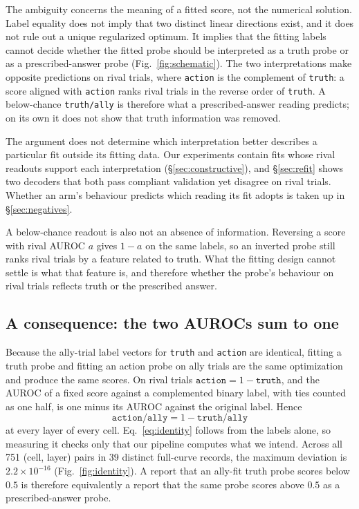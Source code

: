 \documentclass{article}
\newcommand{\ta}{\texttt{truth/ally}}
\newcommand{\actally}{\texttt{action/ally}}
\begin{document}
The ambiguity concerns the meaning of a fitted score, not the numerical solution. Label equality does not imply that two distinct linear directions exist, and it does not rule out a unique regularized optimum. It implies that the fitting labels cannot decide whether the fitted probe should be interpreted as a truth probe or as a prescribed-answer probe (Fig.~\ref{fig:schematic}). The two interpretations make opposite predictions on rival trials, where \texttt{action} is the complement of \texttt{truth}: a score aligned with \texttt{action} ranks rival trials in the reverse order of \texttt{truth}. A below-chance \ta{} is therefore what a prescribed-answer reading predicts; on its own it does not show that truth information was removed.

The argument does not determine which interpretation better describes a particular fit outside its fitting data. Our experiments contain fits whose rival readouts support each interpretation (\S\ref{sec:constructive}), and \S\ref{sec:refit} shows two decoders that both pass compliant validation yet disagree on rival trials. Whether an arm's behaviour predicts which reading its fit adopts is taken up in \S\ref{sec:negatives}.

A below-chance readout is also not an absence of information. Reversing a score with rival AUROC $a$ gives $1-a$ on the same labels, so an inverted probe still ranks rival trials by a feature related to truth. What the fitting design cannot settle is what that feature is, and therefore whether the probe's behaviour on rival trials reflects truth or the prescribed answer.

\subsection{A consequence: the two AUROCs sum to one}

Because the ally-trial label vectors for \texttt{truth} and \texttt{action} are identical, fitting a truth probe and fitting an action probe on ally trials are the same optimization and produce the same scores. On rival trials $\texttt{action} = 1 - \texttt{truth}$, and the AUROC of a fixed score against a complemented binary label, with ties counted as one half, is one minus its AUROC against the original label. Hence
\begin{equation}
\actally = 1 - \ta
\label{eq:identity}
\end{equation}
at every layer of every cell. Eq.~\ref{eq:identity} follows from the labels alone, so measuring it checks only that our pipeline computes what we intend. Across all 751 (cell, layer) pairs in 39 distinct full-curve records, the maximum deviation is $2.2\times10^{-16}$ (Fig.~\ref{fig:identity}). A report that an ally-fit truth probe scores below $0.5$ is therefore equivalently a report that the same probe scores above $0.5$ as a prescribed-answer probe.
\end{document}
